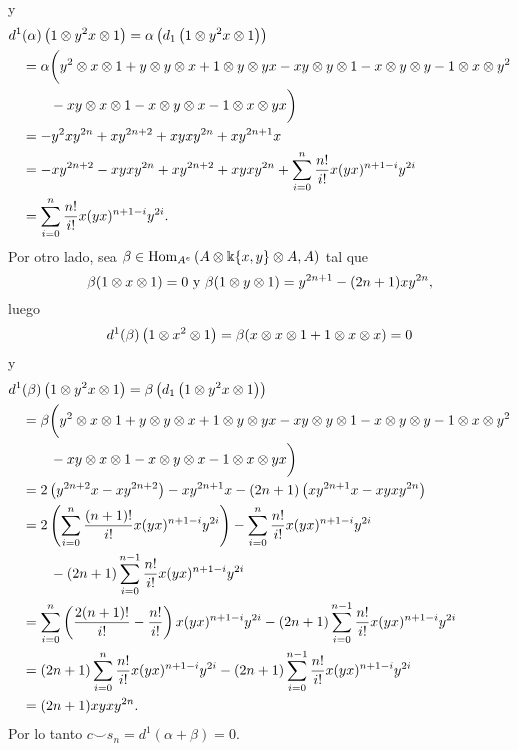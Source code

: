 \documentclass[fleqn,../tesis.tex]{subfiles}
\begin{document}
y
\begin{align*}
	d^{1}&(\alpha)\left(1 \otimes y^2x \otimes 1\right) = \alpha \left(d_1\left(1\otimes y^2x \otimes 1\right)\right)\\
	&=\alpha\bigg(y^2 \otimes x \otimes 1 + y \otimes y \otimes x + 1 \otimes y \otimes yx - xy \otimes y \otimes 1 - x \otimes y \otimes y
		- 1 \otimes x \otimes y^2\\
 	&\qquad- xy \otimes x \otimes 1 - x \otimes y \otimes x - 1 \otimes x \otimes yx\bigg) \\
 	&= -y^2xy^{2n} + xy^{2n + 2} + xyxy^{2n} + x y^{2n + 1}x\\
 	&= -xy^{2n + 2} - xyxy^{2n}+ xy^{2n + 2} + xyxy^{2n} + \sum_{i = 0}^{n}\frac{n!}{i!}x(yx)^{n  + 1 -i}y^{2i}\\
 	&= \sum_{i = 0}^{n}\frac{n!}{i!}x(yx)^{n  + 1 -i}y^{2i}.
\end{align*}
Por otro lado, sea $\beta \in \operatorname{Hom}_{A^e}\left(A\otimes \Bbbk\{x, y\} \otimes A, A\right)$ tal que 
\[
	\beta(1\otimes x \otimes 1) = 0 \text{ y } \beta(1 \otimes y \otimes 1) = y^{2n + 1} - (2n + 1)xy^{2n},
\]
luego
\begin{align*}
	d^1(\beta)\left(1\otimes x^{2} \otimes 1\right) = \beta(x \otimes x \otimes 1 + 1 \otimes x \otimes x) = 0	
\end{align*}
y
\begin{align*}
	d^1&(\beta)\left(1\otimes y^2x \otimes 1\right) = \beta \left(d_1\left(1\otimes y^2x \otimes 1\right)\right)\\
	&=\beta\bigg(y^2 \otimes x \otimes 1 + y \otimes y \otimes x + 1 \otimes y \otimes yx - xy \otimes y \otimes 1 - x \otimes y \otimes y
		- 1 \otimes x \otimes y^2\\
 	&\qquad- xy \otimes x \otimes 1 - x \otimes y \otimes x - 1 \otimes x \otimes yx\bigg) \\
 	&= 2\left(y^{2n + 2}x - xy^{2n + 2}\right) - xy^{2n + 1}x
 		-(2n + 1)\left(xy^{2n + 1}x -xyxy^{2n}\right)\\
 	&= 2\left(\sum_{i = 0}^{n}\frac{(n + 1)!}{i!}x(yx)^{n + 1 -i}y^{2i}\right)
 		- \sum_{i = 0}^{n}\frac{n!}{i!}x(yx)^{n + 1 -i}y^{2i}\\
 	&\qquad - (2n + 1) \sum_{i = 0}^{n - 1}\frac{n!}{i!}x(yx)^{n + 1 -i}y^{2i}\\
 	&= \sum_{i = 0}^{n}\left(\frac{2(n + 1)!}{i!} - \frac{n!}{i!}\right)x(yx)^{n + 1 -i}y^{2i}
 		- (2n + 1) \sum_{i = 0}^{n - 1}\frac{n!}{i!}x(yx)^{n + 1 -i}y^{2i}\\
 	&= (2n + 1)\sum_{i = 0}^{n}\frac{n!}{i!}x(yx)^{n + 1 -i}y^{2i}
 		- (2n + 1) \sum_{i = 0}^{n - 1}\frac{n!}{i!}x(yx)^{n + 1 -i}y^{2i}\\
 	&= (2n + 1)xyxy^{2n}.
\end{align*}
Por lo tanto $c \smile s_n = d^1(\alpha + \beta) = 0$.
\end{document}
